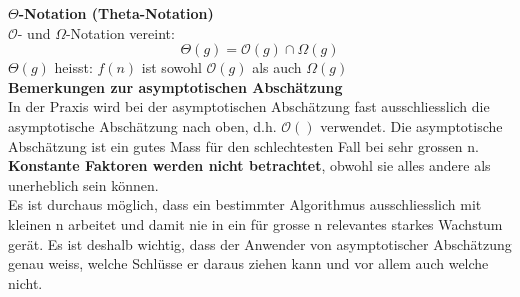 \textbf{$\Theta$-Notation (Theta-Notation)}\\
$\mathcal{O}$- und $\Omega$-Notation vereint:
\begin{equation}
\Theta(g)= \mathcal{O}(g) \cap \Omega(g)
\end{equation}
$\Theta(g)$ heisst: $f(n)$ ist sowohl $\mathcal{O}(g)$ als auch $\Omega(g)$\\

\textbf{Bemerkungen zur asymptotischen Abschätzung}\\
In der Praxis wird bei der asymptotischen Abschätzung fast ausschliesslich die asymptotische Abschätzung nach oben, d.h. $\mathcal{O}()$ verwendet. Die asymptotische Abschätzung ist ein gutes Mass für den schlechtesten Fall bei sehr grossen n. \textbf{Konstante Faktoren werden nicht betrachtet}, obwohl sie alles andere als unerheblich sein können.\\
Es ist durchaus möglich, dass ein bestimmter Algorithmus ausschliesslich mit kleinen n arbeitet und damit nie in ein für grosse n relevantes starkes Wachstum gerät. Es ist deshalb wichtig, dass der Anwender von asymptotischer Abschätzung genau weiss, welche Schlüsse er daraus ziehen kann und vor allem auch welche nicht.\\

